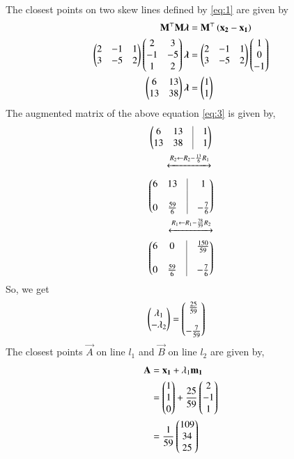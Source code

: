 \documentclass[journal,12pt,twocolumn]{IEEEtran}
\begin{document}
\begin{enumerate}
The closest points on two skew lines defined by \eqref{eq:1} are given by 
\begin{align}
\mathbf{M}^\top \mathbf{M}\bm{\lambda} &= \mathbf{M}^\top\left(\mathbf{x_2}-\mathbf{x_1}\right)\\
\begin{pmatrix}2&-1&1\\3&-5&2\end{pmatrix} \begin{pmatrix}2&3\\-1&-5\\1&2\end{pmatrix}\bm{\lambda} &= \begin{pmatrix}2&-1&1\\3&-5&2\end{pmatrix} \begin{pmatrix}1\\0\\-1\end{pmatrix}\\
\begin{pmatrix}6&13\\13&38\end{pmatrix}\bm{\lambda} &= \begin{pmatrix}1\\1\end{pmatrix}
\label{eq:3}
\end{align}
The augmented matrix of the above equation \eqref{eq:3} is given by,
\begin{align}
\myvec{6&13&\vrule&1\\13&38&\vrule&1}\\
\xleftrightarrow{R_2 \leftarrow R_2 - \frac{13}{6}R_1}
\end{align}
\begin{align}
\myvec{6&13&\vrule&1 \\&&\vrule\\ 0&\frac{59}{6}&\vrule&-\frac{7}{6}}\\
\xleftrightarrow{R_1 \leftarrow R_1 - \frac{78}{59}R_2}\\
\myvec{6&0&\vrule&\frac{150}{59} \\&&\vrule\\ 0&\frac{59}{6}&\vrule&-\frac{7}{6}}
\end{align}
So, we get
\begin{align}
\begin{pmatrix}\lambda_1\\-\lambda_2\end{pmatrix} &= \begin{pmatrix}\frac{25}{59}\\\\-\frac{7}{59}\end{pmatrix}
\end{align}
The closest points $\vec{A}$ on line $l_1$ and $\vec{B}$ on line $l_2$ are given by,
\begin{align}
\vec{A} &= \vec{x_1} + \lambda_1\vec{m_1}\\
&=  \myvec{1\\1\\0} + \frac{25}{59}\myvec{2\\-1\\1}\\
&= \frac{1}{59}\myvec{109\\34\\25}\\

\end{align}
\end{enumerate}
\end{document}
